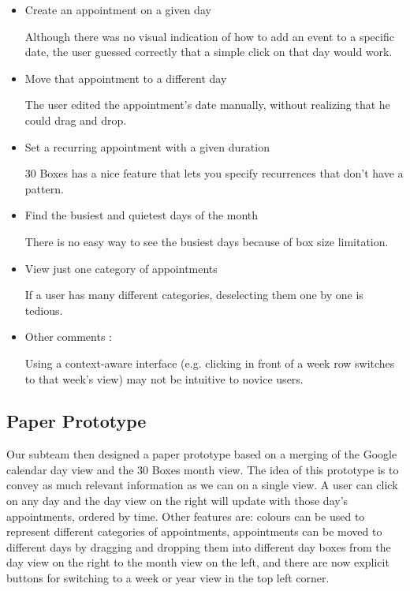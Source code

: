 \documentclass{article}
\begin{document}
\begin{itemize}
\item Create an appointment on a given day

Although there was no visual indication of how to add an event to a
specific date, the user guessed correctly that a simple click on that
day would work.

\item Move that appointment to a different day

The user edited the appointment's date manually, without realizing that
he could drag and drop.

\item Set a recurring appointment with a given duration

30 Boxes has a nice feature that lets you specify recurrences that
don't have a pattern.

\item Find the busiest and quietest days of the month

There is no easy way to see the busiest days because of box size
limitation.

\item View just one category of appointments

If a user has many different categories, deselecting them one by one is
tedious.

\item Other comments :

Using a context-aware interface (e.g. clicking in front of a week row
switches to that week's view) may not be intuitive to novice users.

\end{itemize}

\subsection{Paper Prototype}

Our subteam then designed a paper prototype based on a merging of the
Google calendar day view and the 30 Boxes month view. The idea of this
prototype is to convey as much relevant information as we can on a
single view. A user can click on any day and the day view on the right
will update with those day's appointments, ordered by time. Other
features are: colours can be used to represent different categories
of appointments, appointments can be moved to different days by
dragging and dropping them into different day boxes from the day
view on the right to the month view on the left, and there are now
explicit buttons for switching to a week or year view in the top
left corner. 
\end{document}
